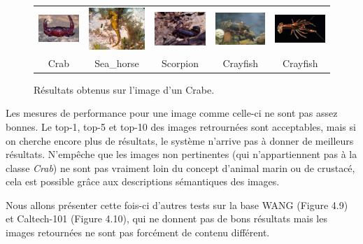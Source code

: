 \begin{figure}[H]
\begin{tabular}{ccccc}
\includegraphics[width=3cm]{Figures/crab/16.jpg}
&
\includegraphics[width=3cm]{Figures/crab/17.jpg}
&
\includegraphics[width=3cm]{Figures/crab/18.jpg}
&
\includegraphics[width=3cm]{Figures/crab/19.jpg}
&
\includegraphics[width=3cm]{Figures/crab/20.jpg}\\
Crab & Sea\_horse & Scorpion & Crayfish & Crayfish\\

\end{tabular}
\caption[comp7]{Résultats obtenus sur l'image d'un Crabe.}
\end{figure}

	Les mesures de performance pour une image comme celle-ci ne sont pas assez bonnes. Le top-1, top-5 et top-10 des images retrournées sont acceptables, mais si on cherche encore plus de résultats, le système n'arrive pas à donner de meilleurs résultats. N’empêche que les images non pertinentes (qui n'appartiennent pas à la classe \textit{Crab}) ne sont pas vraiment loin du concept d'animal marin ou de crustacé, cela est possible grâce aux descriptions sémantiques des images.
	
	Nous allons présenter cette fois-ci d'autres tests sur la base WANG (Figure 4.9) et Caltech-101 (Figure 4.10), qui ne donnent pas de bons résultats mais les images retournées ne sont pas forcément de contenu différent.
	
